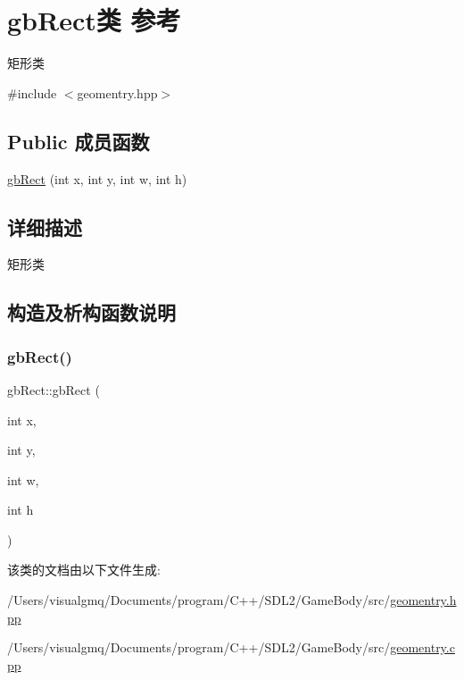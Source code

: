 \hypertarget{classgb_rect}{}\section{gb\+Rect类 参考}
\label{classgb_rect}


矩形类  




{\ttfamily \#include $<$geomentry.\+hpp$>$}

\subsection*{Public 成员函数}
\begin{DoxyCompactItemize}
\item 
\mbox{\hyperlink{classgb_rect_ad87d8d116e21198f08bdcffdbbe6361f}{gb\+Rect}} (int x, int y, int w, int h)
\end{DoxyCompactItemize}


\subsection{详细描述}
矩形类 

\subsection{构造及析构函数说明}
\mbox{\label{classgb_rect_ad87d8d116e21198f08bdcffdbbe6361f}} 
\subsubsection{\texorpdfstring{gbRect()}{gbRect()}}
{\footnotesize\ttfamily gb\+Rect\+::gb\+Rect (\begin{DoxyParamCaption}\item[{int}]{x,  }\item[{int}]{y,  }\item[{int}]{w,  }\item[{int}]{h }\end{DoxyParamCaption})}



该类的文档由以下文件生成\+:\begin{DoxyCompactItemize}
\item 
/\+Users/visualgmq/\+Documents/program/\+C++/\+S\+D\+L2/\+Game\+Body/src/\mbox{\hyperlink{geomentry_8hpp}{geomentry.\+hpp}}\item 
/\+Users/visualgmq/\+Documents/program/\+C++/\+S\+D\+L2/\+Game\+Body/src/\mbox{\hyperlink{geomentry_8cpp}{geomentry.\+cpp}}\end{DoxyCompactItemize}

